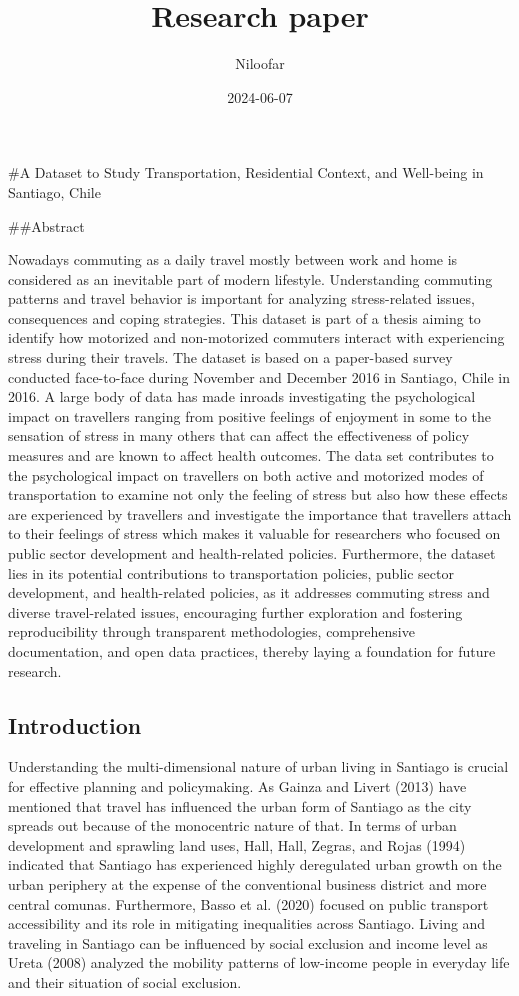 \documentclass[
]{article}
\title{Research paper}
\author{Niloofar}
\date{2024-06-07}
\begin{document}
\maketitle

\#A Dataset to Study Transportation, Residential Context, and Well-being
in Santiago, Chile

\#\#Abstract

Nowadays commuting as a daily travel mostly between work and home is
considered as an inevitable part of modern lifestyle. Understanding
commuting patterns and travel behavior is important for analyzing
stress-related issues, consequences and coping strategies. This dataset
is part of a thesis aiming to identify how motorized and non-motorized
commuters interact with experiencing stress during their travels. The
dataset is based on a paper-based survey conducted face-to-face during
November and December 2016 in Santiago, Chile in 2016. A large body of
data has made inroads investigating the psychological impact on
travellers ranging from positive feelings of enjoyment in some to the
sensation of stress in many others that can affect the effectiveness of
policy measures and are known to affect health outcomes. The data set
contributes to the psychological impact on travellers on both active and
motorized modes of transportation to examine not only the feeling of
stress but also how these effects are experienced by travellers and
investigate the importance that travellers attach to their feelings of
stress which makes it valuable for researchers who focused on public
sector development and health-related policies. Furthermore, the dataset
lies in its potential contributions to transportation policies, public
sector development, and health-related policies, as it addresses
commuting stress and diverse travel-related issues, encouraging further
exploration and fostering reproducibility through transparent
methodologies, comprehensive documentation, and open data practices,
thereby laying a foundation for future research.

\hypertarget{introduction}{%
\subsection{Introduction}\label{introduction}}

Understanding the multi-dimensional nature of urban living in Santiago
is crucial for effective planning and policymaking. As Gainza and Livert
(2013) have mentioned that travel has influenced the urban form of
Santiago as the city spreads out because of the monocentric nature of
that. In terms of urban development and sprawling land uses, Hall, Hall,
Zegras, and Rojas (1994) indicated that Santiago has experienced highly
deregulated urban growth on the urban periphery at the expense of the
conventional business district and more central comunas. Furthermore,
Basso et al. (2020) focused on public transport accessibility and its
role in mitigating inequalities across Santiago. Living and traveling in
Santiago can be influenced by social exclusion and income level as Ureta
(2008) analyzed the mobility patterns of low-income people in everyday
life and their situation of social exclusion.
\end{document}
